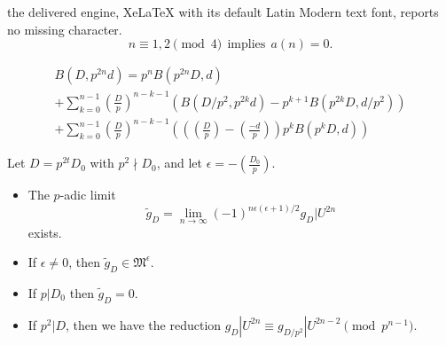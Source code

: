 \documentclass[10pt,a4paper]{amsart}
\newcommand{\gM}{{\mathfrak M}}
\begin{document}
the delivered engine, XeLaTeX with its default Latin Modern text font, reports no missing character.
\begin{equation} \label{eq_Kohnen_plus}
n \equiv 1,2 \pmod{4} ~~ \text{implies} ~~ a(n) = 0.
\end{equation}

\begin{multline} \label{eq_jenkins}
B(D, p^{2n}d) = p^nB(p^{2n} D,d) \\
+ \sum_{k=0}^{n-1} \left( \frac{D}{p} \right)^{n-k-1} \left( B(D/p^2, p{^{2k}}d) - p^{k+1}B(p^{2k}D  , d/p^2)  \right) \\ 
+  \sum_{k=0}^{n-1} \left( \frac{D}{p} \right)^{n-k-1}  \left( \left( \left( \frac{D}{p} \right) - \left( \frac{-d}{p} \right) \right) p^k B(p^kD,d) \right)
\end{multline}

\begin{prop} \label{prop_lim_jenkins} 


Let $D=p^{2t}D_0$ with $p^2 \nmid D_0$, and
let $\epsilon = - \left( \frac{D_0}{p} \right)$.  

\begin{itemize}

\item[\normalfont(i)]
The $p$-adic limit 
\[
\tilde{g}_D = \lim_{n \rightarrow \infty} (-1)^{n\epsilon(\epsilon +1)/2}g_D|U^{2n} 
\]
exists.

\item[\normalfont(ii)]
If $\epsilon \neq 0$, then $\tilde{g}_D  \in \gM^\epsilon$.

\item[\normalfont(iii)]
If $p|D_0$ then $\tilde{g}_D = 0$.

\item[\normalfont(iv)]
If $p^2|D$,  then we have the reduction $g_D|U^{2n} \equiv g_{D/p^2}|U^{2n-2} \pmod {p^{n-1}}$.

\end{itemize}

\end{prop}
\end{document}
